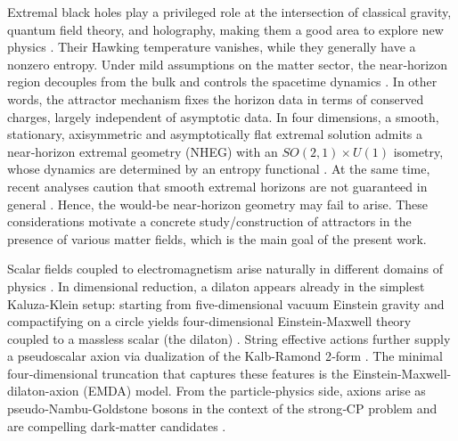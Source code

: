 \documentclass[11pt]{article}
\numberwithin{equation}{section} %
\begin{document}
Extremal black holes play a privileged role at the intersection of classical gravity, quantum field theory, and holography, making them a good area to explore new physics \cite{Sen:2007qy,Compere:2012jk,Horowitz:2023xyl}. Their Hawking temperature vanishes, while they generally have a nonzero entropy. Under mild assumptions on the matter sector, the near‑horizon region decouples from the bulk  and controls the spacetime dynamics \cite{Sen:2007qy,Astefanesei:2006dd,Astefanesei:2007bf,Kunduri:2007vf,Kunduri:2013gce}. In other words, the attractor mechanism fixes the horizon data in terms of conserved charges, largely independent of asymptotic data. In four dimensions, a smooth, stationary, axisymmetric and asymptotically flat extremal solution admits a near‑horizon extremal geometry (NHEG) with an  $SO(2,1)\times U(1)$  isometry, whose dynamics are determined by an entropy functional \cite{Sen:2007qy,Sen:2005iz,Astefanesei:2006dd,Astefanesei:2007bf,Kunduri:2007vf,Kunduri:2013gce}. At the same time, recent analyses caution that smooth extremal horizons are not guaranteed in general \cite{Herdeiro:2025blx,Blazquez-Salcedo:2025cpu,Horowitz:2022mly,Horowitz:2024kcx}. Hence, the would‑be near‑horizon geometry may fail to arise. These considerations motivate a concrete study/construction of attractors in the presence of various matter fields, which is the main goal of the present work.


Scalar fields coupled to electromagnetism arise naturally in different domains of physics \cite{GIBBONS1988741,Garfinkle:1990qj,Sen:1992ua}.  In dimensional reduction, a dilaton appears already in the simplest Kaluza-Klein setup: starting from five-dimensional vacuum Einstein gravity and compactifying on a circle yields four-dimensional Einstein-Maxwell theory coupled to a massless scalar (the dilaton) \cite{Kaluza:1921tu,Klein1926}. String effective actions further supply a pseudoscalar axion via dualization of the Kalb-Ramond 2‑form \cite{PhysRevLett.40.223,PhysRevLett.40.279,Svrcek:2006yi,Ortin:2015hya}. The minimal four‑dimensional truncation that captures these features is the Einstein-Maxwell-dilaton-axion (EMDA) model. From the particle‑physics side, axions arise as pseudo‑Nambu-Goldstone bosons in the context of the strong‑CP problem and are compelling dark‑matter candidates \cite{Marsh:2015xka,Peccei:1977hh,Bergstrom:2009ib}.
\end{document}
